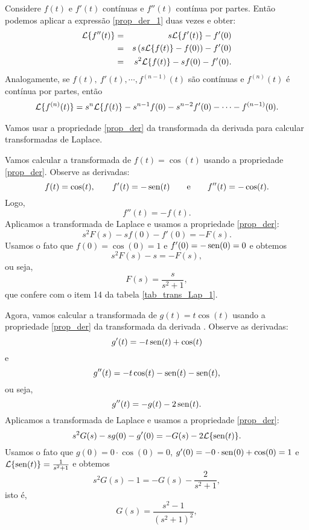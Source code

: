 Considere $f(t)$ e $f'(t)$ contínuas e $f''(t)$ contínua por partes. Então podemos aplicar a expressão \ref{prop_der_1} duas vezes e obter:
\begin{eqnarray}
\nonumber \mathcal{L }\{f''(t)\}&=&s \mathcal{L }\{ f'(t)\}-f'(0)\\ 
\nonumber &=&s\left( s \mathcal{L }\{ f(t)\}-f(0)\right)-f'(0)\\
&=& s^2 \mathcal{L }\{ f(t)\}-sf(0)-f'(0). {\label{prop_der_2}}
\end{eqnarray}
Analogamente, se $f(t),\ f'(t), \cdots, f^{(n-1)}(t)$ são contínuas e $f^{(n)}(t) $ é contínua por partes, então
\begin{eqnarray}{\label{prop_der_n}}
 \mathcal{L }\{f^{(n)}(t)\}= s^n \mathcal{L }\{ f(t)\}-s^{n-1}f(0)-s^{n-2}f'(0)-\cdots-f^{(n-1)}(0). 
\end{eqnarray}


Vamos usar a propriedade \ref{prop_der} da transformada da derivada para calcular transformadas de Laplace.
\begin{ex}Vamos calcular a transformada de $f(t)=\cos(t)$ usando a propriedade \ref{prop_der}. Observe as derivadas:
 $$
 f(t)=\cos(t),\qquad f'(t)=-\operatorname{sen}(t)\qquad\hbox{e}\qquad f''(t)=-\cos(t).
$$
Logo, 
$$
f''(t)=-f(t).
$$
Aplicamos a transformada de Laplace e usamos a propriedade \ref{prop_der}:
$$
s^2F(s)-sf(0)-f'(0)=-F(s).
$$
Usamos o fato que $f(0)=\cos(0)=1$ e $f'(0)=-\operatorname{sen}(0)=0$ e obtemos
$$
s^2F(s)-s=-F(s),
$$
ou seja,
$$
F(s)=\frac{s}{s^2+1},
$$
que confere com o item 14 da tabela \ref{tab_trans_Lap_1}.
\end{ex}
\begin{ex}Agora, vamos calcular a transformada de $g(t)=t\cos(t)$ usando a propriedade \ref{prop_der} da transformada da derivada . Observe as derivadas:
$$
g'(t)=-t\operatorname{sen}(t)+\cos(t)
$$
e
$$
g''(t)=-t\cos(t)-\operatorname{sen}(t)-\operatorname{sen}(t),
$$
ou seja,
$$
g''(t)=-g(t)-2\operatorname{sen}(t).
$$
Aplicamos a transformada de Laplace e usamos a propriedade \ref{prop_der}:
$$
s^2G(s)-sg(0)-g'(0)=-G(s)-2\mathcal{L}\{\operatorname{sen}(t)\}.
$$
Usamos o fato que $g(0)=0\cdot\cos(0)=0$, $g'(0)=-0\cdot \operatorname{sen}(0)+\cos(0)=1$ e $\mathcal{L}\{\operatorname{sen}(t)\}=\frac{1}{s^2+1}$ e obtemos
$$
s^2G(s)-1=-G(s)-\frac{2}{s^2+1},
$$
isto é,
$$
G(s)=\frac{s^2-1}{(s^2+1)^2},
$$
\end{ex}
